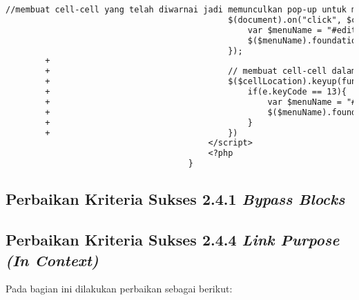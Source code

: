\begin{itemize}
\begin{lstlisting}[frame=single, label={lst:perbaikan_2.1.1_keyboard_entri_jadwal_dosen}, language=diff, caption=Perbaikan Kriteria Sukses 2.1.1 - Penggunaan \textit{Keyboard} pada Halaman Entri Jadwal Dosen]
                                             //membuat cell-cell yang telah diwarnai jadi memunculkan pop-up untuk mengedit jadwal ketika diklik oleh mouse
                                             $(document).on("click", $cellLocation, function () {
                                                 var $menuName = "#edit_menu<?php echo $dataHariIni->id ?>";
                                                 $($menuName).foundation('open');
                                             });
        +                                    
        +                                    // membuat cell-cell dalam tabel dapat diakses menggunakan keyboard
        +                                    $($cellLocation).keyup(function(e){
        +                                        if(e.keyCode == 13){
        +                                            var $menuName = "#edit_menu<?php echo $dataHariIni->id ?>";
        +                                            $($menuName).foundation('open');
        +                                        }
        +                                    })
                                         </script>
                                         <?php
                                     }
    \end{lstlisting}
\end{itemize}


\subsection{Perbaikan Kriteria Sukses 2.4.1 \textit{Bypass Blocks}}
\label{subsec:perbaikan_kriteria_sukses_2.4.1}

\subsection{Perbaikan Kriteria Sukses 2.4.4 \textit{Link Purpose (In Context)}}
\label{subsec:perbaikan_kriteria_sukses_2.4.4}
Pada bagian ini dilakukan perbaikan sebagai berikut:

